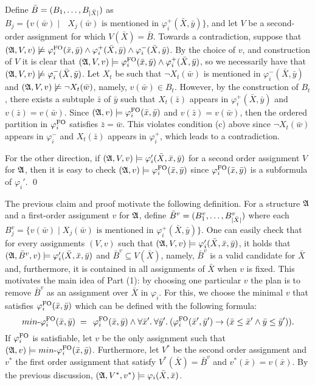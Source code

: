 	Define $\bar{B} = (B_1,\ldots,B_{\vert \bar{X} \vert})$ as $B_j = \{v(\bar{w})\mid \text{ $X_j(\bar{w})$ is mentioned in $\varphi^{+}_i(\bar{X},\bar{y})$}\}$, and let $V$ be a second-order assignment for which $V(\bar{X}) = \bar{B}$.
	Towards a contradiction, suppose that $(\mathfrak{A},V,v)\not\models \varphi^{{\rm FO}}_i(\bar{x},\bar{y}) \wedge \varphi^{+}_i(\bar{X}, \bar{y}) \wedge \varphi^{-}_i(\bar{X},\bar{y})$.
	By the choice of $v$, and construction of $V$ it is clear that $(\mathfrak{A},V,v)\models\varphi^{{\rm FO}}_i(\bar{x},\bar{y})\wedge\varphi^{+}_i(\bar{X},\bar{y})$, so we necessarily have that $(\mathfrak{A},V,v)\not\models\varphi^{-}_i(\bar{X},\bar{y})$.
	Let $X_t$ be such that $\neg X_t(\bar{w})$ is mentioned in $\varphi^{-}_i(\bar{X},\bar{y})$ and $(\mathfrak{A},V, v)\not\models\neg X_t(\bar{w})$, namely, $v(\bar{w})\in B_t$. 
	However, by the construction of $B_t$, there exists a subtuple $\bar{z}$ of $\bar{y}$ such that $X_t(\bar{z})$ appears in $\varphi^{+}_i(\bar{X},\bar{y})$ and $v(\bar{z}) = v(\bar{w})$. Since $(\mathfrak{A},v)\models\varphi^{{\rm FO}}_i(\bar{x},\bar{y})$ and $v(\bar{z}) = v(\bar{w})$, then the ordered partition in $\varphi^{{\rm FO}}_i$ satisfies $\bar{z} = \bar{w}$. This violates condition (c) above since $\neg X_t(\bar{w})$ appears in $\varphi^{-}_i$ and $X_t(\bar{z})$ appears in $\varphi^{+}_i$, which leads to a contradiction. 
	
	For the other direction, if $(\mathfrak{A},V,v)\models \varphi_i'(\bar{X},\bar{x}, \bar{y})$ for a second order assignment $V$ for $\mathfrak{A}$, then it is easy to check $(\mathfrak{A},v)\models\varphi^{{\rm FO}}_i(\bar{x},\bar{y})$ since $\varphi^{{\rm FO}}_i(\bar{x},\bar{y})$ is a subformula of $\varphi_i'$.
\qed

The previous claim and proof motivate the following definition.
For a structure $\mathfrak{A}$ and a first-order assignment $v$ for $\mathfrak{A}$, define $\bar{B}^v = (B^v_1,\ldots,B^v_{\vert \bar{X} \vert})$ where each $B^v_j = \{v(\bar{w}) \mid \text{$X_j(\bar{w})$ is mentioned in $\varphi^{+}_i(\bar{X},\bar{y})$}\}$.
One can easily check that for every assignments $(V, v)$ such that $(\mathfrak{A},V,v)\models \varphi_i'(\bar{X}, \bar{x}, \bar{y})$, it holds that $(\mathfrak{A},\bar{B}^v,v)\models \varphi_i'(\bar{X}, \bar{x}, \bar{y})$ and $\bar{B}^v \subseteq V(\bar{X})$, namely, $\bar{B}^v$ is a valid candidate for $\bar{X}$ and, furthermore, it is contained in all assignments of $\bar{X}$ when $v$ is fixed.
This motivates the main idea of Part (1): by choosing one particular $v$ the plan is to remove $\bar{B}^v$ as an assignment over $\bar{X}$ in $\varphi_i$. 
For this, we choose the minimal $v$ that satisfies $\varphi^{{\rm FO}}_i(\bar{x},\bar{y})$ which can be defined with the following formula:
\[
\text{$min$-}\varphi^{{\rm FO}}_i(\bar{x}, \bar{y}) \; = \;  \,\varphi_i^{{\rm FO}}(\bar{x},\bar{y})\wedge \forall{\bar{x}'}.\: \forall{\bar{y}'}.\:(\varphi_i^{{\rm FO}}(\bar{x}',\bar{y}')\to ( \bar{x}\leq\bar{x}' \wedge  \bar{y}\leq\bar{y}')).
\] 
If $\varphi^{{\rm FO}}_i$ is satisfiable, let $v$ be the only assignment such that  $(\mathfrak{A},v)\models \text{$min$-}\varphi^{{\rm FO}}_i(\bar{x}, \bar{y})$. 
Furthermore, let $V^*$ be the second order assignment and $v^*$ the first order assignment that satisfy $V^*(\bar{X}) = \bar{B}^{v}$ and $v^*(\bar{x}) = v(\bar{x})$.
By the previous discussion, $(\mathfrak{A},V^*,v^*)\models\varphi_i(\bar{X},\bar{x})$.

